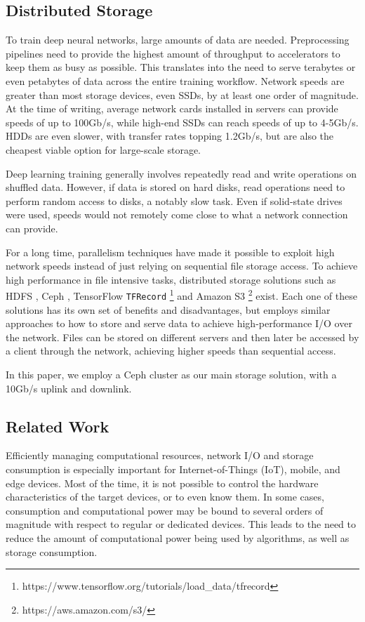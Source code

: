 \documentclass[sigconf,nonacm]{acmart}
\begin{document}
\subsection{Distributed Storage}
To train deep neural networks, large amounts of data are needed.
Preprocessing pipelines need to provide the highest amount of throughput to accelerators to keep them as busy as possible.
This translates into the need to serve terabytes or even petabytes of data across the entire training workflow.
Network speeds are greater than most storage devices, even SSDs, by at least one order of magnitude.
At the time of writing, average network cards installed in servers can provide speeds of up to 100Gb/s, while high-end SSDs can reach speeds of up to 4-5Gb/s.
HDDs are even slower, with transfer rates topping 1.2Gb/s, but are also the cheapest viable option for large-scale storage.

Deep learning training generally involves repeatedly read and write operations on shuffled data.
However, if data is stored on hard disks, read operations need to perform random access to disks, a notably slow task.
Even if solid-state drives were used, speeds would not remotely come close to what a network connection can provide.

For a long time, parallelism techniques have made it possible to exploit high network speeds instead of just relying on sequential file storage access.
To achieve high performance in file intensive tasks, distributed storage solutions such as HDFS \cite{hdfs2010}, Ceph \cite{ceph2006}, TensorFlow \texttt{TFRecord} \footnote{https://www.tensorflow.org/tutorials/load\_data/tfrecord} and Amazon S3 \footnote{https://aws.amazon.com/s3/} exist.
Each one of these solutions has its own set of benefits and disadvantages, but employs similar approaches to how to store and serve data to achieve high-performance I/O over the network.
Files can be stored on different servers and then later be accessed by a client through the network, achieving higher speeds than sequential access.

In this paper, we employ a Ceph cluster as our main storage solution, with a 10Gb/s uplink and downlink.

\subsection{Related Work}
Efficiently managing computational resources, network I/O and storage consumption is especially important for Internet-of-Things (IoT), mobile, and edge devices.
Most of the time, it is not possible to control the hardware characteristics of the target devices, or to even know them.
In some cases, consumption and computational power may be bound to several orders of magnitude with respect to regular or dedicated devices.
This leads to the need to reduce the amount of computational power being used by algorithms, as well as storage consumption.
\end{document}
